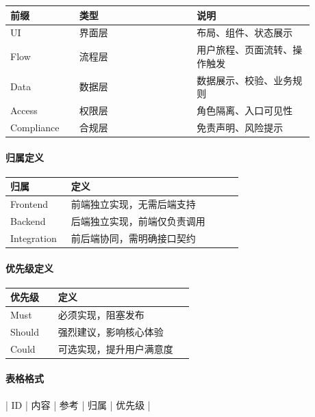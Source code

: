 \begingroup
\small
\begin{longtable}{L{0.20\linewidth}L{0.34\linewidth}L{0.34\linewidth}}
\toprule
\textbf{前缀} & \textbf{类型} & \textbf{说明} \\
\midrule
UI & 界面层 & 布局、组件、状态展示 \\
Flow & 流程层 & 用户旅程、页面流转、操作触发 \\
Data & 数据层 & 数据展示、校验、业务规则 \\
Access & 权限层 & 角色隔离、入口可见性 \\
Compliance & 合规层 & 免责声明、风险提示 \\
\bottomrule
\end{longtable}
\endgroup

\paragraph{归属定义}

\begingroup
\small
\begin{longtable}{L{0.24\linewidth}L{0.68\linewidth}}
\toprule
\textbf{归属} & \textbf{定义} \\
\midrule
Frontend & 前端独立实现，无需后端支持 \\
Backend & 后端独立实现，前端仅负责调用 \\
Integration & 前后端协同，需明确接口契约 \\
\bottomrule
\end{longtable}
\endgroup

\paragraph{优先级定义}

\begingroup
\small
\begin{longtable}{L{0.24\linewidth}L{0.68\linewidth}}
\toprule
\textbf{优先级} & \textbf{定义} \\
\midrule
Must & 必须实现，阻塞发布 \\
Should & 强烈建议，影响核心体验 \\
Could & 可选实现，提升用户满意度 \\
\bottomrule
\end{longtable}
\endgroup

\paragraph{表格格式}

\begin{codeblock}
| ID | 内容 | 参考 | 归属 | 优先级 |
\end{codeblock}

